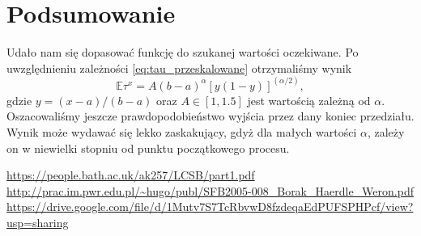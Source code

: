 \documentclass[12pt]{mwrep}
\begin{document}
	\section{Podsumowanie}
	\noindent Udało nam się dopasować funkcję do szukanej wartości oczekiwane. Po uwzględnieniu zależności \eqref{eq:tau_przeskalowane} otrzymaliśmy wynik
	\begin{equation}
		\mathbb{E}\tau^x=A\left(b-a\right)^\alpha\left[y(1-y)\right]^{(\alpha/2)},
	\end{equation}
	gdzie $y=(x-a)/(b-a)$ oraz $A\in[1, 1.5]$ jest wartością zależną od $\alpha$. Oszacowaliśmy jeszcze prawdopodobieństwo wyjścia przez dany koniec przedziału. Wynik może wydawać się lekko zaskakujący, gdyż dla małych wartości $\alpha$, zależy on w niewielki stopniu od punktu początkowego procesu.
	
	\newpage
	\begin{thebibliography}{1}
		\url{https://people.bath.ac.uk/ak257/LCSB/part1.pdf}
		\url{http://prac.im.pwr.edu.pl/~hugo/publ/SFB2005-008_Borak_Haerdle_Weron.pdf}
		\url{https://drive.google.com/file/d/1Mutv7S7TcRbvwD8fzdeqaEdPUFSPHPcf/view?usp=sharing}
	\end{thebibliography}
\end{document}
